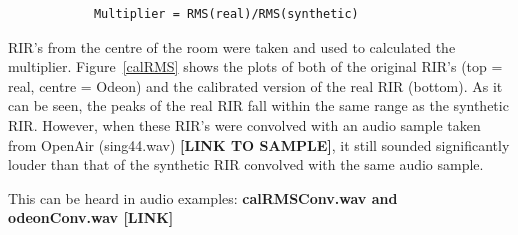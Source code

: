 \documentclass[../../main.tex]{subfiles}
\begin{document}
		\begin{lstlisting}
			Multiplier = RMS(real)/RMS(synthetic)
		\end{lstlisting}

		\ac{RIR}'s from the centre of the room were taken and used to calculated the multiplier. Figure~\ref{calRMS} shows the plots of both of the original \ac{RIR}'s (top = real, centre = Odeon) and the calibrated version of the real \ac{RIR} (bottom). As it can be seen, the peaks of the real \ac{RIR} fall within the same range as the synthetic \ac{RIR}. However, when these \ac{RIR}'s were convolved with an audio sample taken from OpenAir \cite{singingSample} (sing44.wav) \textbf{[LINK TO SAMPLE]}, it still sounded significantly louder than that of the synthetic RIR convolved with the same audio sample.

		This can be heard in audio examples: \textbf{calRMSConv.wav and odeonConv.wav [LINK]}
\end{document}
